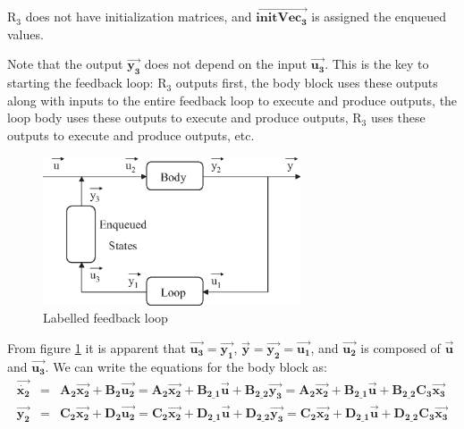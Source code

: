     $\mathrm{R_3}$ does not have initialization matrices, and
$\overrightarrow{\mathbf{initVec_3}}$ is assigned the enqueued
values.

    Note that the output $\vec{\mathbf{y_3}}$ does not depend on
the input $\vec{\mathbf{u_3}}$. This is the key to starting the
feedback loop: $\mathrm{R_3}$ outputs first, the body block uses
these outputs along with inputs to the entire feedback loop to
execute and produce outputs, the loop body uses these outputs to
execute and produce outputs, $\mathrm{R_3}$ uses these outputs to
execute and produce outputs, etc.

\begin{figure}[bthp]
  \centering
  \includegraphics[width=3.0in]{figures/feedback2.eps}
  \caption{Labelled feedback loop}
  \label{fig:feedback2}
\end{figure}

    From figure \ref{fig:feedback2} it is apparent that $\vec{\mathbf{u_3}} =
\vec{\mathbf{y_1}}$, $\vec{\mathbf{y}} = \vec{\mathbf{y_2}} =
\vec{\mathbf{u_1}}$, and $\vec{\mathbf{u_2}}$ is composed of
$\vec{\mathbf{u}}$ and $\vec{\mathbf{u_3}}$. We can write the
equations for the body block as:
\begin{eqnarray*}
\vec{\dot{\mathbf{x_2}}} & = & \mathbf{A_2} \vec{\mathbf{x_2}} +
\mathbf{B_2} \vec{\mathbf{u_2}} = \mathbf{A_2}\vec{\mathbf{x_2}} +
\mathbf{B_{2\_1}} \vec{\mathbf{u}} + \mathbf{B_{2\_2}}
\vec{\mathbf{y_3}} = \mathbf{A_2}\vec{\mathbf{x_2}} +
\mathbf{B_{2\_1}} \vec{\mathbf{u}} + \mathbf{B_{2\_2}}
\mathbf{C_3} \vec{\mathbf{x_3}} \\
\vec{\mathbf{y_2}} & = & \mathbf{C_2} \vec{\mathbf{x_2}} +
\mathbf{D_2} \vec{\mathbf{u_2}} = \mathbf{C_2}\vec{\mathbf{x_2}} +
\mathbf{D_{2\_1}} \vec{\mathbf{u}} + \mathbf{D_{2\_2}}
\vec{\mathbf{y_3}} = \mathbf{C_2}\vec{\mathbf{x_2}} +
\mathbf{D_{2\_1}} \vec{\mathbf{u}} + \mathbf{D_{2\_2}}
\mathbf{C_3} \vec{\mathbf{x_3}}
\end{eqnarray*}

